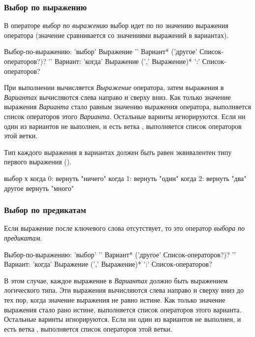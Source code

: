 \hypertarget{switch-stmt-expr}{%
\subsubsection{Выбор по выражению}\label{stmt:switch-stmt-expr}}

В операторе \emph{выбор по выражению} выбор идет по по значению выражения оператора (значение сравнивается со значениями выражений в вариантах).

\begin{Grammar}
Выбор-по-выражению: 
    'выбор' Выражение '{'
    Вариант*
    ('другое' Список-операторов?)?
    '}'
Вариант:
    'когда' Выражение (',' Выражение)* ':' 
    Список-операторов?
\end{Grammar}

При выполнении вычисляется \emph{Выражение} оператора,
затем выражения в \emph{Вариантах} вычисляются слева направо и сверху вниз. 
Как только значение выражения \emph{Варианта} стало равным значению выражения оператора, выполняется список операторов этого \emph{Варианта}.
Остальные варинты игнорируются.
Если ни один из вариантов не выполнен, и есть ветка , выполняется список операторов этой ветки.

Тип каждого выражения в вариантах должен быть равен эквивалентен типу первого выражения ().

\begin{Trivil}
выбор х {
когда 0: вернуть "ничего"
когда 1: вернуть "один"
когда 2: вернуть "два"
другое вернуть "много"
}
\end{Trivil}

\hypertarget{switch-stmt-predicate}{%
\subsubsection{Выбор по предикатам}\label{stmt:switch-stmt-predicate}}

Если выражение после ключевого слова  отсутствует, 
то это оператор \emph{выбора по предикатам}.

\begin{Grammar}
Выбор-по-выражению: 
    'выбор' '{'
    Вариант*
    ('другое' Список-операторов?)?
    '}'
Вариант:
    'когда' Выражение (',' Выражение)* ':' 
    Список-операторов?
\end{Grammar}

В этом случае, каждое выражение в \emph{Вариантах} должно быть выражением логического типа. 
Эти выражения вычисляются  слева направо и сверху вниз до тех пор, когда значение выражения не равно истине. 
Как только значение выражения стало рано истине, выполняется список операторов этого варианта. Остальные варинты игнорируются.
Если ни один из вариантов не выполнен, и есть ветка , выполняется список операторов этой ветки.


